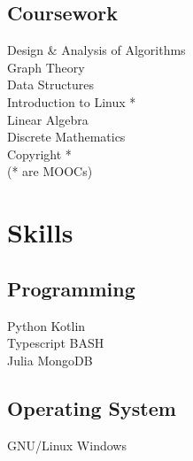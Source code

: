 \documentclass[]{deedy-resume-openfont}
\begin{document}
\begin{minipage}[t]{0.33\textwidth}


\subsection{Coursework}
Design \& Analysis of Algorithms \\
Graph Theory \\
Data Structures \\
Introduction to Linux {*}\\
Linear Algebra \\
Discrete Mathematics \\
Copyright {*}
\\
({*} are MOOCs)
\sectionsep


\section{Skills}
\subsection{Programming}
\textbullet{} Python \textbullet{} Kotlin \\
\textbullet{} Typescript \textbullet{} BASH \\
\textbullet{} Julia \textbullet{} MongoDB \\
\subsection{Operating System}
\textbullet{} GNU/Linux \textbullet{} Windows

\end{minipage}
\end{document}

